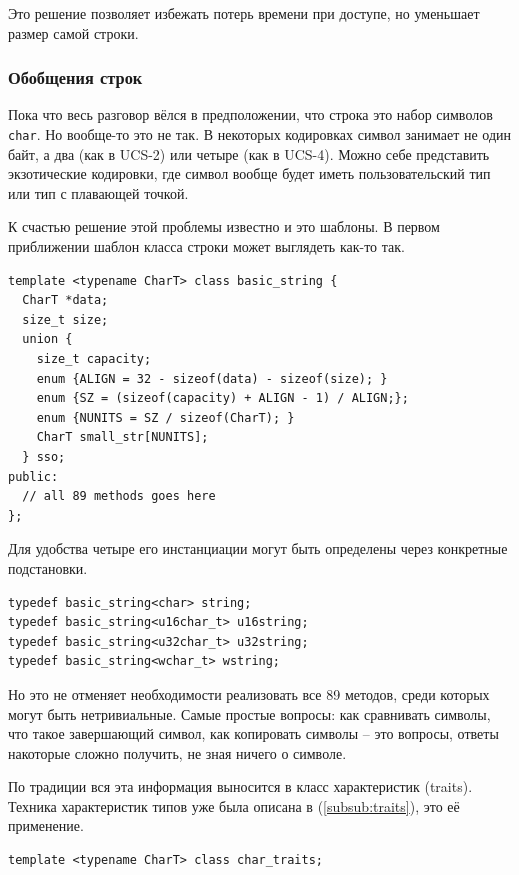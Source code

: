 \documentclass[a4paper,12pt,oneside]{article}
\begin{document}
Это решение позволяет избежать потерь времени при доступе, но уменьшает размер самой строки.

\subsubsection{Обобщения строк}\label{subsub:strtraits}

Пока что весь разговор вёлся в предположении, что строка это набор символов \lstinline!char!. Но вообще-то это не так. В некоторых кодировках символ занимает не один байт, а два (как в UCS-2) или четыре (как в UCS-4). Можно себе представить экзотические кодировки, где символ вообще будет иметь пользовательский тип или тип с плавающей точкой.

К счастью решение этой проблемы известно и это шаблоны. В первом приближении шаблон класса строки может выглядеть как-то так.

\begin{lstlisting}
template <typename CharT> class basic_string {
  CharT *data;
  size_t size;
  union {
    size_t capacity;
    enum {ALIGN = 32 - sizeof(data) - sizeof(size); }
    enum {SZ = (sizeof(capacity) + ALIGN - 1) / ALIGN;};
    enum {NUNITS = SZ / sizeof(CharT); }
    CharT small_str[NUNITS];
  } sso;
public:
  // all 89 methods goes here
};
\end{lstlisting}

Для удобства четыре его инстанциации могут быть определены через конкретные подстановки.

\begin{lstlisting}
typedef basic_string<char> string;
typedef basic_string<u16char_t> u16string;
typedef basic_string<u32char_t> u32string;
typedef basic_string<wchar_t> wstring;
\end{lstlisting}

Но это не отменяет необходимости реализовать все 89 методов, среди которых могут быть нетривиальные. Самые простые вопросы: как сравнивать символы, что такое завершающий символ, как копировать символы -- это вопросы, ответы накоторые сложно получить, не зная ничего о символе.

По традиции вся эта информация выносится в класс характеристик (traits). Техника характеристик типов уже была описана в (\ref{subsub:traits}), это её применение.

\begin{lstlisting}
template <typename CharT> class char_traits;
\end{lstlisting}
\end{document}
